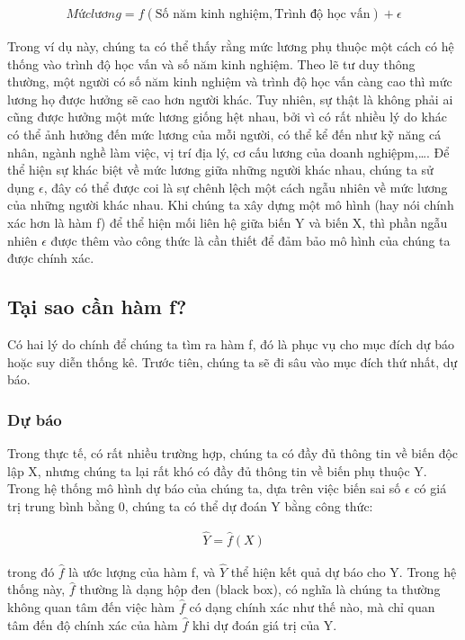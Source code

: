 \documentclass[
]{article}
\begin{document}
\begin{align}
Mức lương = f(\text{Số năm kinh nghiệm}, \text{Trình độ học vấn}) + \epsilon
\end{align}

Trong ví dụ này, chúng ta có thể thấy rằng mức lương phụ thuộc một cách có hệ thống vào trình độ học vấn và số năm kinh nghiệm. Theo lẽ tư duy thông thường, một người có số năm kinh nghiệm và trình độ học vấn càng cao thì mức lương họ được hưởng sẽ cao hơn người khác. Tuy nhiên, sự thật là không phải ai cũng được hưởng một mức lương giống hệt nhau, bởi vì có rất nhiều lý do khác có thể ảnh hưởng đến mức lương của mỗi người, có thể kể đến như kỹ năng cá nhân, ngành nghề làm việc, vị trí địa lý, cơ cấu lương của doanh nghiệpm,\ldots. Để thể hiện sự khác biệt về mức lương giữa những người khác nhau, chúng ta sử dụng \(\epsilon\), đây có thể được coi là sự chênh lệch một cách ngẫu nhiên về mức lương của những người khác nhau. Khi chúng ta xây dựng một mô hình (hay nói chính xác hơn là hàm f) để thể hiện mối liên hệ giữa biến Y và biến X, thì phần ngẫu nhiên \(\epsilon\) được thêm vào công thức là cần thiết để đảm bảo mô hình của chúng ta được chính xác.

\hypertarget{tux1ea1i-sao-cux1ea7n-huxe0m-f}{%
\subsection{Tại sao cần hàm f?}\label{tux1ea1i-sao-cux1ea7n-huxe0m-f}}

Có hai lý do chính để chúng ta tìm ra hàm f, đó là phục vụ cho mục đích dự báo hoặc suy diễn thống kê. Trước tiên, chúng ta sẽ đi sâu vào mục đích thứ nhất, dự báo.

\hypertarget{dux1ef1-buxe1o}{%
\subsubsection{Dự báo}\label{dux1ef1-buxe1o}}

Trong thực tế, có rất nhiều trường hợp, chúng ta có đầy đủ thông tin về biến độc lập X, nhưng chúng ta lại rất khó có đầy đủ thông tin về biến phụ thuộc Y. Trong hệ thống mô hình dự báo của chúng ta, dựa trên việc biến sai số \(\epsilon\) có giá trị trung bình bằng 0, chúng ta có thể dự đoán Y bằng công thức:

\begin{align}
\hat{Y} = \hat{f}(X)
\end{align}

trong đó \(\hat{f}\) là ước lượng của hàm f, và \(\hat{Y}\) thể hiện kết quả dự báo cho Y. Trong hệ thống này, \(\hat{f}\) thường là dạng hộp đen (black box), có nghĩa là chúng ta thường không quan tâm đến việc hàm \(\hat{f}\) có dạng chính xác như thế nào, mà chỉ quan tâm đến độ chính xác của hàm \(\hat{f}\) khi dự đoán giá trị của Y.
\end{document}
